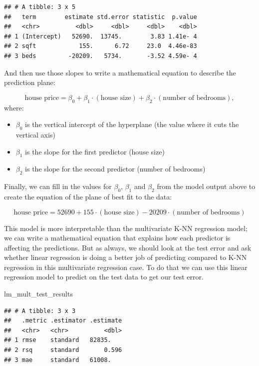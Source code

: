 \documentclass[
]{krantz}
\makeatletter
\newenvironment{Shaded}{\begin{snugshade}}{\end{snugshade}}
\newcommand{\NormalTok}[1]{#1}
\providecommand{\tightlist}{%
  \setlength{\itemsep}{0pt}\setlength{\parskip}{0pt}}
\newenvironment{kframe}{%
\medskip{}
\setlength{\fboxsep}{.8em}
 \def\at@end@of@kframe{}%
 \ifinner\ifhmode%
  \def\at@end@of@kframe{\end{minipage}}%
  \begin{minipage}{\columnwidth}%
 \fi\fi%
 \def\FrameCommand##1{\hskip\@totalleftmargin \hskip-\fboxsep
 \colorbox{shadecolor}{##1}\hskip-\fboxsep
     \hskip-\linewidth \hskip-\@totalleftmargin \hskip\columnwidth}%
 \MakeFramed {\advance\hsize-\width
   \@totalleftmargin\z@ \linewidth\hsize
   \@setminipage}}%
 {\par\unskip\endMakeFramed%
 \at@end@of@kframe}
\renewenvironment{Shaded}{\begin{kframe}}{\end{kframe}}
\makeatother
\begin{document}
\begin{verbatim}
## # A tibble: 3 x 5
##   term        estimate std.error statistic  p.value
##   <chr>          <dbl>     <dbl>     <dbl>    <dbl>
## 1 (Intercept)   52690.  13745.        3.83 1.41e- 4
## 2 sqft            155.      6.72     23.0  4.46e-83
## 3 beds         -20209.   5734.       -3.52 4.59e- 4
\end{verbatim}

And then use those slopes to write a mathematical equation to describe the prediction plane:

\[\text{house price} = \beta_0 + \beta_1\cdot(\text{house size}) + \beta_2\cdot(\text{number of bedrooms}),\]
where:

\begin{itemize}
\tightlist
\item
  \(\beta_0\) is the vertical intercept of the hyperplane (the value where it cuts the vertical axis)
\item
  \(\beta_1\) is the slope for the first predictor (house size)
\item
  \(\beta_2\) is the slope for the second predictor (number of bedrooms)
\end{itemize}

Finally, we can fill in the values for \(\beta_0\), \(\beta_1\) and \(\beta_2\) from the model output above
to create the equation of the plane of best fit to the data:

\[\text{house price} = 52690 + 155\cdot (\text{house size})  -20209 \cdot (\text{number of bedrooms})\]

This model is more interpretable than the multivariate K-NN
regression model; we can write a mathematical equation that explains how
each predictor is affecting the predictions. But as always, we should look at
the test error and ask whether linear regression is doing a better job of
predicting compared to K-NN regression in this multivariate regression case. To
do that we can use this linear regression model to predict on the test data to
get our test error.

\begin{Shaded}
\begin{Highlighting}[]
\NormalTok{lm\_mult\_test\_results}
\end{Highlighting}
\end{Shaded}

\begin{verbatim}
## # A tibble: 3 x 3
##   .metric .estimator .estimate
##   <chr>   <chr>          <dbl>
## 1 rmse    standard   82835.   
## 2 rsq     standard       0.596
## 3 mae     standard   61008.
\end{verbatim}
\end{document}

